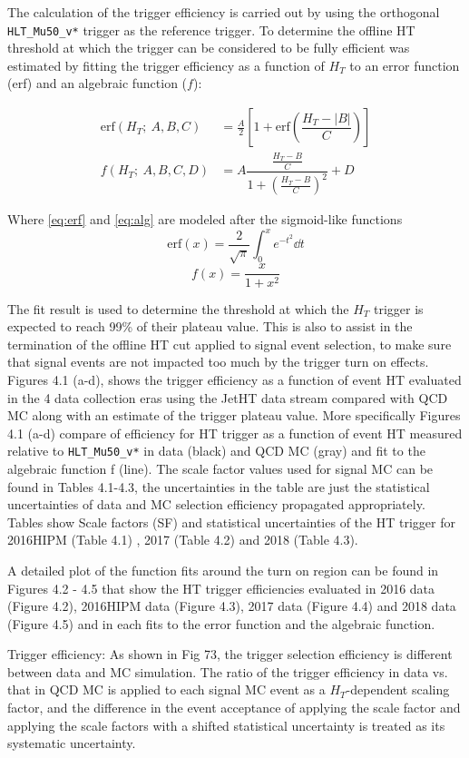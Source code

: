 The calculation of the trigger efficiency is carried out by using the orthogonal \verb|HLT_Mu50_v*| trigger as the reference trigger. To determine the offline HT threshold at which the trigger can be considered to be fully efficient was estimated by fitting the trigger efficiency as a function of $H_T$ to an error function (erf) and an algebraic function ($f$):

\begin{align}
	\text{erf}(H_T ;\ A,B,C) & = \frac A2 \left[1+ \text{erf}\left(\dfrac{H_T - |B|}{C}\right) \right]\label{eq:erf} \\
	f(H_T ;\ A,B,C,D)        & = A \dfrac{\frac{H_T - B}{C}}{1+ \left(\frac{H_T - B}{C}\right)^2} + D \label{eq:alg}
\end{align}

Where \eqref{eq:erf} and \eqref{eq:alg} are modeled after the sigmoid-like functions
\[
	\text{erf}(x) = \frac{2}{\sqrt{\pi}} \int_0^x e^{-t^2} \dd{t}
\]
\[
	f(x)=\frac{x}{1+x^{2}}
\]


The fit result is used to determine the threshold at which the $H_T$ trigger is expected to reach 99\% of their plateau value. This is also to assist in the termination of the offline HT cut applied to signal event selection, to make sure that signal events are not impacted too much by the trigger turn on effects. Figures 4.1 (a-d), shows the trigger efficiency as a function of event HT evaluated in the 4 data collection eras using the JetHT data stream compared with QCD MC along with an estimate of the trigger plateau value.
More specifically Figures 4.1 (a-d) compare of efficiency for HT trigger as a function of event HT measured relative to \verb|HLT_Mu50_v*| in data (black) and QCD MC (gray) and fit to the algebraic function f (line). The scale factor values used for signal MC can be found in Tables 4.1-4.3, the uncertainties in the table are just the statistical uncertainties of data and MC selection efficiency propagated appropriately. Tables show Scale factors (SF) and statistical uncertainties of the HT trigger for 2016HIPM (Table 4.1) , 2017  (Table 4.2) and 2018 (Table 4.3).

A detailed plot of the function fits around the turn on region can be found in Figures 4.2 - 4.5 that show the HT trigger efficiencies evaluated in 2016 data (Figure 4.2), 2016HIPM data (Figure 4.3), 2017 data (Figure 4.4)  and 2018 data  (Figure 4.5)  and in each fits to the error function and the algebraic function.



Trigger efficiency: As shown in Fig 73, the trigger selection efficiency is different between data
and MC simulation. The ratio of the trigger efficiency in data vs. that in QCD MC is applied
to each signal MC event as a $H_T$-dependent scaling factor, and the difference in the event acceptance of applying the scale factor and applying the scale factors with a shifted statistical
uncertainty is treated as its systematic uncertainty.
